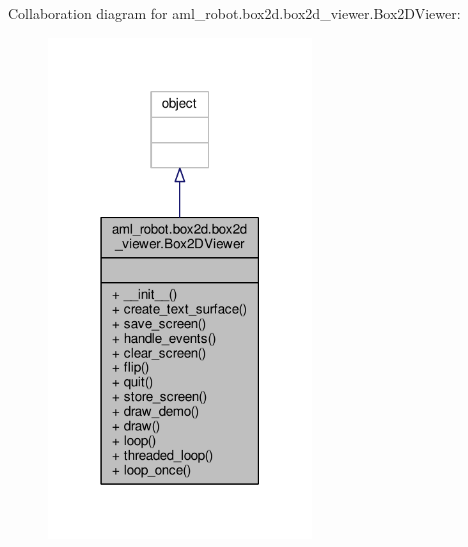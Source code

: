 Collaboration diagram for aml\-\_\-robot.\-box2d.\-box2d\-\_\-viewer.\-Box2\-D\-Viewer\-:
\nopagebreak
\begin{figure}[H]
\begin{center}
\leavevmode
\includegraphics[width=198pt]{classaml__robot_1_1box2d_1_1box2d__viewer_1_1_box2_d_viewer__coll__graph}
\end{center}
\end{figure}
